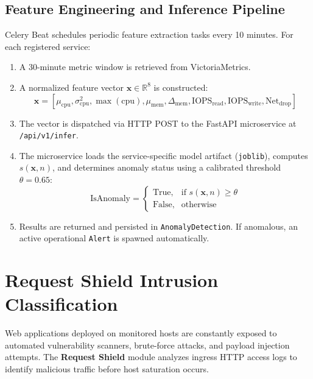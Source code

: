 \subsection{Feature Engineering and Inference Pipeline}
Celery Beat schedules periodic feature extraction tasks every 10 minutes. For each registered service:
\begin{enumerate}
  \item A 30-minute metric window is retrieved from VictoriaMetrics.
  \item A normalized feature vector $\mathbf{x} \in \mathbb{R}^8$ is constructed:
  \begin{equation}
    \mathbf{x} = \left[ \mu_{\text{cpu}}, \sigma_{\text{cpu}}^2, \max(\text{cpu}), \mu_{\text{mem}}, \Delta_{\text{mem}}, \text{IOPS}_{\text{read}}, \text{IOPS}_{\text{write}}, \text{Net}_{\text{drop}} \right]
  \end{equation}
  \item The vector is dispatched via HTTP POST to the FastAPI microservice at \texttt{/api/v1/infer}.
  \item The microservice loads the service-specific model artifact (\texttt{joblib}), computes $s(\mathbf{x}, n)$, and determines anomaly status using a calibrated threshold $\theta = 0.65$:
  \begin{equation}
    \text{IsAnomaly} = \begin{cases} \text{True}, & \text{if } s(\mathbf{x}, n) \geq \theta \\ \text{False}, & \text{otherwise} \end{cases}
  \end{equation}
  \item Results are returned and persisted in \texttt{AnomalyDetection}. If anomalous, an active operational \texttt{Alert} is spawned automatically.
\end{enumerate}

\section{Request Shield Intrusion Classification}
Web applications deployed on monitored hosts are constantly exposed to automated vulnerability scanners, brute-force attacks, and payload injection attempts. The \textbf{Request Shield} module analyzes ingress HTTP access logs to identify malicious traffic before host saturation occurs.

